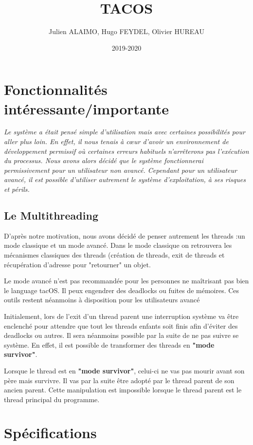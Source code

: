 \documentclass{article}
\title{TACOS}
\author{Julien ALAIMO, Hugo FEYDEL, Olivier HUREAU }
\date{2019-2020}
\begin{document}
\maketitle

\section{Fonctionnalités intéressante/importante}
\textit{
Le système a était pensé simple d'utilisation mais avec certaines possibilités pour aller plus loin. En effet, il nous tenais à cœur d'avoir un environnement de développement permissif où certaines erreurs habituels n'arrêterons pas l'exécution du processus. Nous avons alors décidé que le système fonctionnerai permissivement pour un utilisateur non avancé. Cependant pour un utilisateur avancé, il est possible d'utiliser autrement le système d'exploitation, à ses risques et périls.
}

\subsection{Le Multithreading}

D'après notre motivation, nous avons décidé de penser autrement les threads :un mode classique et un mode avancé. Dans le mode classique on retrouvera les mécanismes classiques des threads (création de threads, exit de threads et récupération d'adresse pour "retourner" un objet.

Le mode avancé n'est pas recommandée pour les personnes ne maîtrisant pas bien le language tacOS. Il peux engendrer des deadlocks ou fuites de mémoires. Ces outils restent néanmoins à disposition pour les utilisateurs avancé
 
\vspace{5mm}


Initialement, lors de l'exit d'un thread parent une interruption système va être enclenché pour attendre que tout les threads enfants soit finis afin d'éviter des deadlocks ou autres. Il sera néanmoins possible par la suite de ne pas suivre se système.
En effet, il est possible de transformer des threads en \textbf{"mode survivor"}.

Lorsque le thread est en \textbf{"mode survivor"}, celui-ci ne vas pas mourir avant son père mais survivre. Il vas par la suite être adopté par le thread parent de son ancien parent. 
Cette manipulation est impossible lorsque le thread parent est le thread principal du programme.

\newpage
\section{Spécifications}
\end{document}
